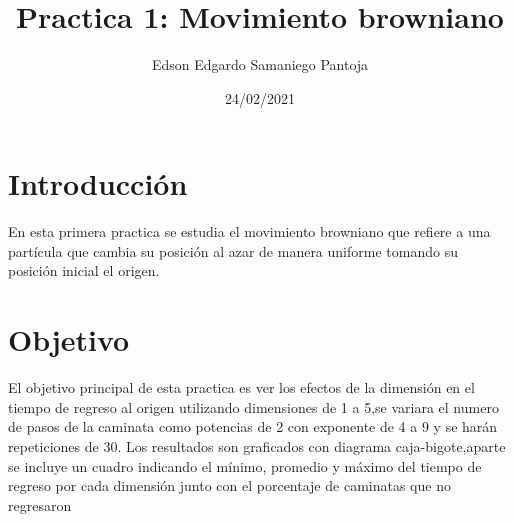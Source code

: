 \documentclass[a4paper]{article}
\title{Practica 1: Movimiento browniano}
\author{Edson Edgardo Samaniego Pantoja}
\date{24/02/2021}
\begin{document}
\maketitle
\section{Introducción}
En esta primera practica se estudia el movimiento browniano que refiere a una partícula que cambia su posición al azar de manera uniforme tomando su posición inicial el origen.
\section{Objetivo}
El objetivo principal de esta practica es ver los efectos de la dimensión en el tiempo de regreso al origen utilizando dimensiones de 1 a 5,se variara el numero de pasos de la caminata como potencias de 2 con exponente de 4 a 9 y se harán repeticiones de 30. Los resultados son graficados con diagrama caja-bigote,aparte se incluye un cuadro indicando el mínimo, promedio y máximo del tiempo de regreso por cada dimensión junto con el porcentaje de caminatas que no regresaron 
\end{document}
